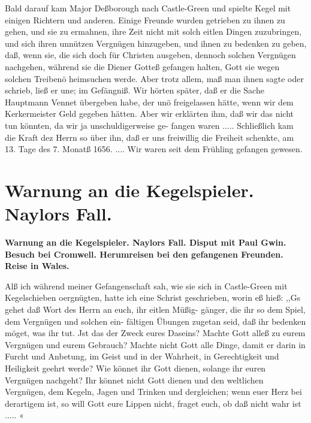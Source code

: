 Bald darauf kam Major Deßborough nach Castle-Green und
spielte Kegel mit einigen Richtern und anderen. Einige Freunde
wurden getrieben zu ihnen zu gehen, und sie zu ermahnen, ihre
Zeit nicht mit solch eitlen Dingen zuzubringen, und sich ihren
unnützen Vergnügen hinzugeben, und ihnen zu bedenken zu geben,
daß, wenn sie, die sich doch für Christen ausgeben, dennoch solchen
Vergnügen nachgehen, während sie die Diener Gotteß gefangen
halten, Gott sie wegen solchen Treibenö heimsuchen werde. Aber
trotz allem, maß man ihnen sagte oder schrieb, ließ er une; im
Gefängniß. Wir hörten später, daß er die Sache Hauptmann
Vennet übergeben habe, der unö freigelassen hätte, wenn wir
dem Kerkermeister Geld gegeben hätten. Aber wir erklärten ihm,
daß wir das nicht tun könnten, da wir ja unschuldigerweise ge-
fangen waren ..... Schließlich kam die Kraft dez Herrn so
über ihn, daß er uns freiwillig die Freiheit schenkte, am 13. Tage
des 7. Monatß 1656. .... Wir waren seit dem Frühling
gefangen gewesen.


\chapter[Warnung an die Kegelspieler. Naylors Fall.]{Warnung an die Kegelspieler. Naylors Fall.}

\begin{center}
\textbf{Warnung an die Kegelspieler. Naylors Fall. Disput mit Paul
Gwin. Besuch bei Cromwell. Herumreisen bei den gefangenen
Freunden. Reise in Wales.}
\end{center}


Alß ich während meiner Gefangenschaft sah, wie sie sich in
Castle-Green mit Kegelschieben oergnügten, hatte ich eine Schrist
geschrieben, worin eß hieß:
,,Gs gehet daß Wort des Herrn an euch, ihr eitlen Müßig-
gänger, die ihr so dem Spiel, dem Vergnügen und solchen ein-
fältigen Übungen zugetan seid, daß ihr bedenken möget, was ihr
tut. Jst das der Zweck eures Daseins? Machte Gott alleß zu
eurem Vergnügen und eurem Gebrauch? Machte nicht Gott alle
Dinge, damit er darin in Furcht und Anbetung, im Geist und in
der Wahrheit, in Gerechtigkeit und Heiligkeit geehrt werde? Wie
könnet ihr Gott dienen, solange ihr euren Vergnügen nachgeht?
Ihr könnet nicht Gott dienen und den weltlichen Vergnügen, dem
Kegeln, Jagen und Trinken und dergleichen; wenn euer Herz bei
derartigem ist, so will Gott eure Lippen nicht, fraget euch, ob daß
nicht wahr ist ..... «


